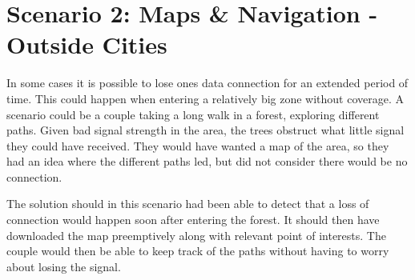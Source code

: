 \section{Scenario 2: Maps \& Navigation - Outside Cities}
In some cases it is possible to lose ones data connection for an extended period of time. This could happen when entering a relatively big zone without coverage. A scenario could be a couple taking a long walk in a forest, exploring different paths. Given bad signal strength in the area, the trees obstruct what little signal they could have received. They would have wanted a map of the area, so they had an idea where the different paths led, but did not consider there would be no connection.

The solution should in this scenario had been able to detect that a loss of connection would happen soon after entering the forest. It should then have downloaded the map preemptively along with relevant point of interests. The couple would then be able to keep track of the paths without having to worry about losing the signal.
